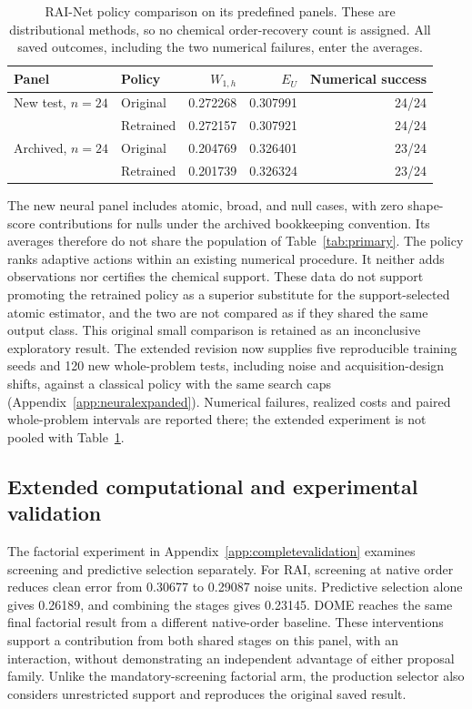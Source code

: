 \begin{table}[htbp]\centering
\caption{RAI-Net policy comparison on its predefined panels. These are distributional methods, so no chemical order-recovery count is assigned. All saved outcomes, including the two numerical failures, enter the averages.}\label{tab:net}
\begin{tabular}{llrrr}\toprule
Panel & Policy & $W_{1,h}$ & $E_U$ & Numerical success\\\midrule
New test, $n=24$ & Original & 0.272268 & 0.307991 & 24/24\\
 & Retrained & 0.272157 & 0.307921 & 24/24\\
Archived, $n=24$ & Original & 0.204769 & 0.326401 & 23/24\\
 & Retrained & 0.201739 & 0.326324 & 23/24\\\bottomrule
\end{tabular}
\end{table}

The new neural panel includes atomic, broad, and null cases, with zero shape-score contributions for nulls under the archived bookkeeping convention. Its averages therefore do not share the population of Table~\ref{tab:primary}. The policy ranks adaptive actions within an existing numerical procedure. It neither adds observations nor certifies the chemical support. These data do not support promoting the retrained policy as a superior substitute for the support-selected atomic estimator, and the two are not compared as if they shared the same output class. This original small comparison is retained as an inconclusive exploratory result. The extended revision now supplies five reproducible training seeds and 120 new whole-problem tests, including noise and acquisition-design shifts, against a classical policy with the same search caps (Appendix~\ref{app:neuralexpanded}). Numerical failures, realized costs and paired whole-problem intervals are reported there; the extended experiment is not pooled with Table~\ref{tab:net}.


\subsection{Extended computational and experimental validation}\label{sec:extendedresults}
The factorial experiment in Appendix~\ref{app:completevalidation} examines
screening and predictive selection separately. For RAI, screening at native order
reduces clean error from 0.30677 to 0.29087 noise units. Predictive selection alone
gives 0.26189, and combining the stages gives 0.23145. DOME reaches the same final
factorial result from a different native-order baseline. These interventions
support a contribution from both shared stages on this panel, with an interaction,
without demonstrating an independent advantage of either proposal family. Unlike
the mandatory-screening factorial arm, the production selector also considers
unrestricted support and reproduces the original saved result.

